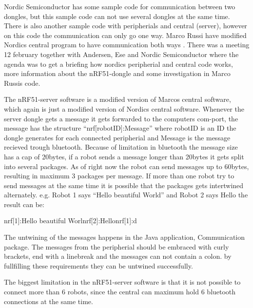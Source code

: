 Nordic Semiconductor has some sample code for communication between two dongles, but this sample code can not use several dongles at the same time. There is also another sample code with peripherials and central (server), however on this code the communication can only go one way. Marco Russi have modified Nordics central program to have communication both ways \cite{marcoRussi}. There was a meeting 12 february together with Andersen, Ese and Nordic Semiconductor where the agenda was to get a briefing how nordics peripherial and central code works, more information about the nRF51-dongle and some investigation in Marco Russis code.

The nRF51-server software is a modified version of Marcos central software, which again is just a modified version of Nordics central software. Whenever the server dongle gets a message it gets forwarded to the computers com-port, the message has the structure ``nrf[robotID]:Message'' where robotID is an ID the dongle generates for each connected peripherial and Message is the message recieved trough bluetooth. Because of limitation in bluetooth the message size has a cap of 20bytes, if a robot sends a message longer than 20bytes it gets split into several packages. As of right now the robot can send messages up to 60bytes, resulting in maximum 3 packages per message. If more than one robot try to send messages at the same time it is possible that the packages gets intertwined alternately. e.g. Robot 1 says ``Hello beautiful World'' and Robot 2 says Hello the result can be: 

nrf[1]:Hello beautiful Worlnrf[2]:Hellonrf[1]:d

The untwining of the messages happens in the Java application, Communication package. The messages from the peripherial should be embraced with curly brackets, end with a linebreak and the messages can not contain a colon. by fullfilling these requirements they can be untwined successfully.

The biggest limitation in the nRF51-server software is that it is not possible to connect more than 6 robots, since the central can maximum hold 6 bluetooth connections at the same time.

